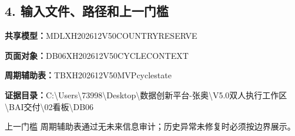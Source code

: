 \documentclass[UTF8,openany,zihao=-4]{ctexbook}
\renewcommand{\_}{\textunderscore\allowbreak}
\begin{document}
\subsection*{4. 输入文件、路径和上一门槛}
\noindent\textbf{共享模型：}{\promptlatin\promptcjk\small MDL\_\allowbreak{}XH202612\_\allowbreak{}V50\_\allowbreak{}COUNTRY\_\allowbreak{}RESERVE}\par
\noindent\textbf{页面对象：}{\promptlatin\promptcjk\small DB06\_\allowbreak{}XH202612\_\allowbreak{}V50\_\allowbreak{}CYCLE\_\allowbreak{}CONTEXT}\par
\noindent\textbf{周期辅助表：}{\promptlatin\promptcjk\small TB\_\allowbreak{}XH202612\_\allowbreak{}V50\_\allowbreak{}MVP\_\allowbreak{}cycle\_\allowbreak{}state}\par
\noindent\textbf{证据目录：}{\promptlatin\promptcjk\small C:\textbackslash{}\allowbreak{}Users\textbackslash{}\allowbreak{}73998\textbackslash{}\allowbreak{}Desktop\textbackslash{}\allowbreak{}数据创新平台-\allowbreak{}张奥\textbackslash{}\allowbreak{}V5.0\_\allowbreak{}双人执行工作区\textbackslash{}\allowbreak{}B\_\allowbreak{}AI交付\textbackslash{}\allowbreak{}02\_\allowbreak{}看板\textbackslash{}\allowbreak{}DB06}\par
\begin{gatebox}{上一门槛}
周期辅助表通过无未来信息审计；历史异常未修复时必须按边界展示。

\end{gatebox}
\end{document}
